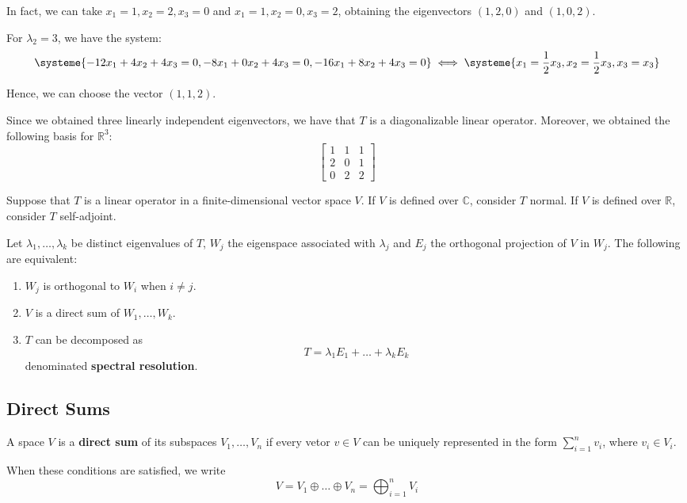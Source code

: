 \begin{example}
	In fact, we can take $x_1 = 1, x_2 = 2, x_3 = 0$ and $x_1 = 1, x_2 = 0, x_3 = 2$, obtaining the eigenvectors $(1,2,0)$ and $(1,0,2)$.

	For $\lambda_2 = 3$, we have the system:
	\[
		\systeme{-12x_1 + 4 x_2 + 4x_3 = 0, -8x_1+0x_2+4x_3 = 0, -16x_1+8x_2+4x_3 = 0} \iff \systeme{x_1 = \frac{1}{2} x_3, x_2 = \frac{1}{2} x_3, x_3 = x_3}
	\]

	Hence, we can choose the vector $(1,1,2)$.

	Since we obtained three linearly independent eigenvectors, we have that $T$ is a diagonalizable linear operator. Moreover, we obtained the following basis for $\mathbb{R}^3$:
	\[
		\begin{bmatrix}
			1 & 1 & 1 \\
			2 & 0 & 1 \\
			0 & 2 & 2
		\end{bmatrix}
	\]
\end{example}

\begin{theorem}
	Suppose that $T$ is a linear operator in a finite-dimensional vector space $V$. If $V$ is defined over $\mathbb{C}$, consider $T$ normal. If $V$ is defined over $\mathbb{R}$, consider $T$ self-adjoint.

	Let $\lambda_1, \ldots, \lambda_k$ be distinct eigenvalues of $T$, $W_j$ the eigenspace associated with $\lambda_j$ and $E_j$ the orthogonal projection of $V$ in $W_j$. The following are equivalent:
	\begin{enumerate}
	\item $W_j$ is orthogonal to $W_i$ when $i \neq j$.
	\item $V$ is a direct sum of $W_1, \ldots, W_k$.
	\item $T$ can be decomposed as \[T = \lambda_1 E_1 + \ldots + \lambda_k E_k\] denominated \textbf{spectral resolution}.
	\end{enumerate}
\end{theorem}

\subsection{Direct Sums}

\begin{definition}
	A space $V$ is a \textbf{direct sum} of its subspaces $V_1, \ldots, V_n$ if every vetor $v \in V$ can be uniquely represented in the form $\sum_{i=1}^n v_i$, where $v_i \in V_i$.

	When these conditions are satisfied, we write
	\[
		V = V_1 \oplus \ldots \oplus V_n = \bigoplus_{i=1}^n V_i
	\]
\end{definition}

